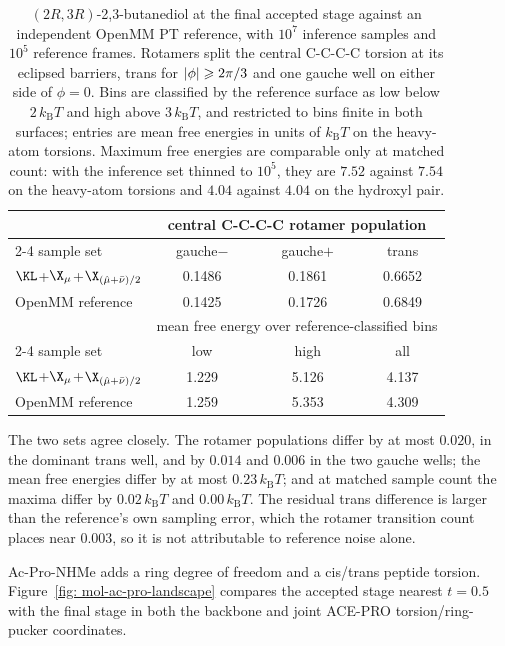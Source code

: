 \documentclass{article}
\begin{document}
\begin{table}[htb]
\centering
\small
\begin{tabular}{lccc}
\toprule
& \multicolumn{3}{c}{central C-C-C-C rotamer population} \\
\cmidrule(l){2-4}
sample set & gauche\(-\) & gauche\(+\) & trans \\
\midrule
$\KL$+$\X_\mu$+$\X_{(\hat\mu+\bar\nu)/2}$ & 0.1486 & 0.1861 & 0.6652 \\
OpenMM reference & 0.1425 & 0.1726 & 0.6849 \\
\midrule
& \multicolumn{3}{c}{mean free energy over reference-classified bins} \\
\cmidrule(l){2-4}
sample set & low & high & all \\
\midrule
$\KL$+$\X_\mu$+$\X_{(\hat\mu+\bar\nu)/2}$ & 1.229 & 5.126 & 4.137 \\
OpenMM reference & 1.259 & 5.353 & 4.309 \\
\bottomrule
\end{tabular}
\caption{\((2R,3R)\)-2,3-butanediol at the final accepted stage against an independent OpenMM PT reference, with \(10^7\) inference samples and \(10^5\) reference frames. Rotamers split the central C-C-C-C torsion at its eclipsed barriers, trans for \(|\phi|\geqslant2\pi/3\) and one gauche well on either side of \(\phi=0\). Bins are classified by the reference surface as low below \(2\,k_{\mathrm B}T\) and high above \(3\,k_{\mathrm B}T\), and restricted to bins finite in both surfaces; entries are mean free energies in units of \(k_{\mathrm B}T\) on the heavy-atom torsions. Maximum free energies are comparable only at matched count: with the inference set thinned to \(10^5\), they are \(7.52\) against \(7.54\) on the heavy-atom torsions and \(4.04\) against \(4.04\) on the hydroxyl pair.}
\label{tab: mol-butanediol-reference}
\end{table}

The two sets agree closely. The rotamer populations differ by at most \(0.020\), in the dominant trans well, and by \(0.014\) and \(0.006\) in the two gauche wells; the mean free energies differ by at most \(0.23\,k_{\mathrm B}T\); and at matched sample count the maxima differ by \(0.02\,k_{\mathrm B}T\) and \(0.00\,k_{\mathrm B}T\). The residual trans difference is larger than the reference's own sampling error, which the rotamer transition count places near \(0.003\), so it is not attributable to reference noise alone.

Ac-Pro-NHMe adds a ring degree of freedom and a cis/trans peptide torsion. Figure~\ref{fig: mol-ac-pro-landscape} compares the accepted stage nearest \(t=0.5\) with the final stage in both the backbone and joint ACE-PRO torsion/ring-pucker coordinates.
\end{document}
